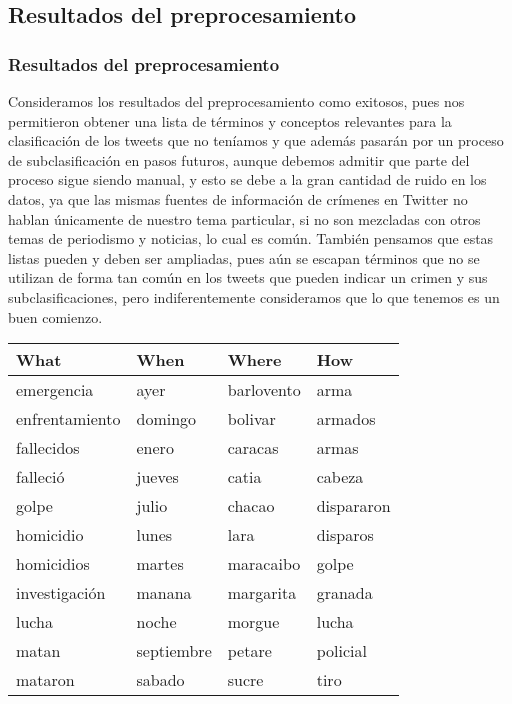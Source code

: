 \documentclass{beamer}
\newcommand\Fontvi{\fontsize{10}{7.2}\selectfont}
\begin{document}
\subsection{Resultados del preprocesamiento}
\begin{frame}
\frametitle{Resultados del preprocesamiento}
\Fontvi
Consideramos los resultados del preprocesamiento como exitosos, pues nos permitieron obtener una lista de t\'{e}rminos y conceptos relevantes para la clasificaci\'{o}n de los tweets que no ten\'{i}amos y que adem\'{a}s pasar\'{a}n por un proceso de subclasificaci\'{o}n en pasos futuros, aunque debemos admitir que parte del proceso sigue siendo manual, y esto se debe a la gran cantidad de ruido en los datos, ya que las mismas fuentes de informaci\'{o}n de cr\'{i}menes en Twitter no hablan únicamente de nuestro tema particular, si no son mezcladas con otros temas de periodismo y noticias, lo cual es común. 
Tambi\'{e}n pensamos que estas listas pueden y deben ser ampliadas, pues aún se escapan t\'{e}rminos que no se utilizan de forma tan común en los tweets que pueden indicar un crimen y sus subclasificaciones, pero indiferentemente consideramos que lo que tenemos es un buen comienzo.
\end{frame}

\begin{frame}
\Fontvi
\begin{table}
\begin{center}
\begin{tabular}{ | p{2 cm} | p{2 cm} | p{2 cm} | p{2 cm} | }
\toprule
\textbf{What} & \textbf{When} & \textbf{ Where } & \textbf{ How } \\
\midrule
 emergencia   & ayer & barlovento & arma\\ \hline 
 enfrentamiento & domingo & bolivar & armados\\ \hline   
 fallecidos & enero & caracas & armas\\ \hline 
 falleci\'{o} & jueves & catia & cabeza\\ \hline   
 golpe  & julio & chacao & dispararon\\ \hline  
 homicidio & lunes & lara & disparos\\ \hline   
 homicidios & martes & maracaibo & golpe\\ \hline
 investigaci\'{o}n & manana & margarita & granada\\ \hline
 lucha & noche & morgue & lucha\\ \hline
 matan & septiembre & petare & policial\\ \hline
 mataron & sabado & sucre & tiro\\ \hline

\bottomrule
\end{tabular}
\end{center}
\end{table}


\end{frame}
\end{document}
